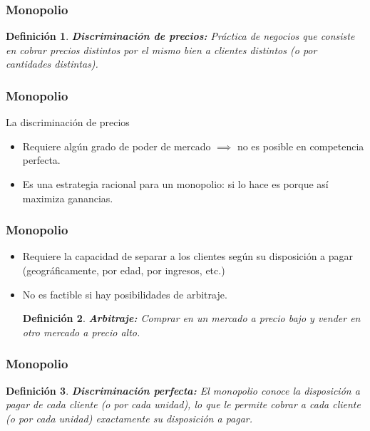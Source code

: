 \documentclass[dvipsnames,table,leqno]{beamer}
\newtheorem{mydef}{Definición}
\begin{document}
		\begin{frame}
			\frametitle{Monopolio}
			\begin{mydef}
				\textbf{Discriminación de precios:} Práctica de negocios que consiste en cobrar precios distintos por el mismo bien a clientes distintos (o por cantidades distintas).
			\end{mydef}
		\end{frame}	

		\begin{frame}
			\frametitle{Monopolio}
			La discriminación de precios
			\begin{itemize}
				\item Requiere algún grado de poder de mercado $\implies$ no es posible en competencia perfecta.
				\item Es una estrategia racional para un monopolio: si lo hace es porque así maximiza ganancias.
			\end{itemize}
		\end{frame}	

		\begin{frame}
			\frametitle{Monopolio}
			\begin{itemize}
				\item Requiere la capacidad de separar a los clientes según su disposición a pagar (geográficamente, por edad, por ingresos, etc.)
				\item No es factible si hay posibilidades de arbitraje.
				\begin{mydef}
					\textbf{Arbitraje:} Comprar en un mercado a precio bajo y vender en otro mercado a precio alto.
				\end{mydef}
			\end{itemize}
		\end{frame}	

		\begin{frame}
			\frametitle{Monopolio}
			\begin{mydef}
				\textbf{Discriminación perfecta:} El monopolio conoce la disposición a pagar de cada cliente (o por cada unidad), lo que le permite cobrar a cada cliente (o por cada unidad) exactamente su disposición a pagar.
			\end{mydef}
		\end{frame}	
\end{document}
